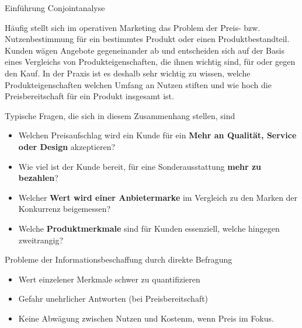 \documentclass[12pt,ngerman,a4paper,ignorenonframetext,]{beamer}
\providecommand{\tightlist}{%
  \setlength{\itemsep}{0pt}\setlength{\parskip}{0pt}}
\begin{document}
\begin{frame}{Einführung Conjointanalyse}
\protect\hypertarget{einfuhrung-conjointanalyse}{}

Häufig stellt sich im operativen Marketing das Problem der Preis- bzw.
Nutzenbestimmung für ein bestimmtes Produkt oder einen
Produktbestandteil. Kunden wägen Angebote gegeneinander ab und
entscheiden sich auf der Basis eines Vergleichs von
Produkteigenschaften, die ihnen wichtig sind, für oder gegen den Kauf.
In der Praxis ist es deshalb sehr wichtig zu wissen, welche
Produkteigenschaften welchen Umfang an Nutzen stiften und wie hoch die
Preisbereitschaft für ein Produkt insgesamt ist.

Typische Fragen, die sich in diesem Zusammenhang stellen, sind

\begin{itemize}
\tightlist
\item
  Welchen Preisaufschlag wird ein Kunde für ein \textbf{Mehr an
  Qualität, Service oder Design} akzeptieren?
\item
  Wie viel ist der Kunde bereit, für eine Sonderausstattung \textbf{mehr
  zu bezahlen}?
\item
  Welcher \textbf{Wert wird einer Anbietermarke} im Vergleich zu den
  Marken der Konkurrenz beigemessen?
\item
  Welche \textbf{Produktmerkmale} sind für Kunden essenziell, welche
  hingegen zweitrangig?
\end{itemize}

\end{frame}

\begin{frame}{Probleme der Informationsbeschaffung durch direkte
Befragung}
\protect\hypertarget{probleme-der-informationsbeschaffung-durch-direkte-befragung}{}

\begin{itemize}
\tightlist
\item
  Wert einzelener Merkmale schwer zu quantifizieren
\item
  Gefahr unehrlicher Antworten (bei Preisbereitschaft)
\item
  Keine Abwägung zwischen Nutzen und Kostenm, wenn Preis im Fokus.
\end{itemize}

\end{frame}
\end{document}
